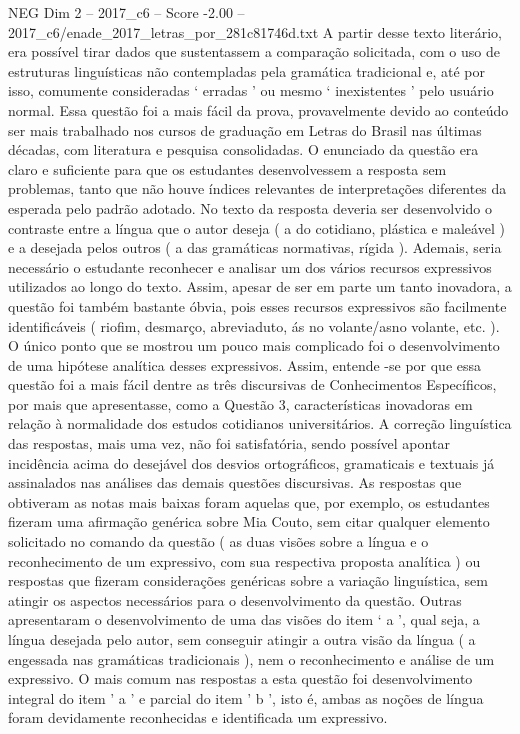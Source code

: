 \begin{textsample}{NEG Dim 2 – 2017\_c6 – Score -2.00 – 2017\_c6/enade\_2017\_letras\_por\_281c81746d.txt}
A partir desse texto literário, era possível tirar dados que sustentassem a comparação solicitada, com o uso de estruturas linguísticas não contempladas pela gramática tradicional e, até por isso, comumente consideradas ‘ erradas ’ ou mesmo ‘ inexistentes ’ pelo usuário normal.
Essa questão foi a mais fácil da prova, provavelmente devido ao conteúdo ser mais trabalhado nos cursos de graduação em Letras do Brasil nas últimas décadas, com literatura e pesquisa consolidadas.
O enunciado da questão era claro e suficiente para que os estudantes desenvolvessem a resposta sem problemas, tanto que não houve índices relevantes de interpretações diferentes da esperada pelo padrão adotado.
No texto da resposta deveria ser desenvolvido o contraste entre a língua que o autor deseja ( a do cotidiano, plástica e maleável ) e a desejada pelos outros ( a das gramáticas normativas, rígida ).
Ademais, seria necessário o estudante reconhecer e analisar um dos vários recursos expressivos utilizados ao longo do texto.
Assim, apesar de ser em parte um tanto inovadora, a questão foi também bastante óbvia, pois esses recursos expressivos são facilmente identificáveis ( riofim, desmarço, abreviaduto, ás no volante/asno volante, etc. ).
O único ponto que se mostrou um pouco mais complicado foi o desenvolvimento de uma hipótese analítica desses expressivos.
Assim, entende -se por que essa questão foi a mais fácil dentre as três discursivas de Conhecimentos Específicos, por mais que apresentasse, como a Questão 3, características inovadoras em relação à normalidade dos estudos cotidianos universitários.
A correção linguística das respostas, mais uma vez, não foi satisfatória, sendo possível apontar incidência acima do desejável dos desvios ortográficos, gramaticais e textuais já assinalados nas análises das demais questões discursivas.
As respostas que obtiveram as notas mais baixas foram aquelas que, por exemplo, os estudantes fizeram uma afirmação genérica sobre Mia Couto, sem citar qualquer elemento solicitado no comando da questão ( as duas visões sobre a língua e o reconhecimento de um expressivo, com sua respectiva proposta analítica ) ou respostas que fizeram considerações genéricas sobre a variação linguística, sem atingir os aspectos necessários para o desenvolvimento da questão.
Outras apresentaram o desenvolvimento de uma das visões do item ‘ a ’, qual seja, a língua desejada pelo autor, sem conseguir atingir a outra visão da língua ( a engessada nas gramáticas tradicionais ), nem o reconhecimento e análise de um expressivo.
O mais comum nas respostas a esta questão foi desenvolvimento integral do item ' a ' e parcial do item ' b ', isto é, ambas as noções de língua foram devidamente reconhecidas e identificada um expressivo.

\end{textsample}
